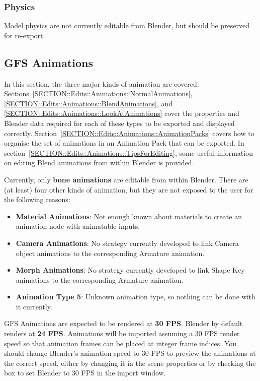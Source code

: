 \documentclass{article}
\begin{document}
\subsubsection{Physics}
Model physics are not currently editable from Blender, but should be preserved for re-export.

\clearpage
\subsection{GFS Animations}
In this section, the three major kinds of animation are covered. Sections~\ref{SECTION::Edits::Animations::NormalAnimations}, \ref{SECTION::Edits::Animations::BlendAnimations}, and \ref{SECTION::Edits::Animations::LookAtAnimations} cover the properties and Blender data required for each of these types to be exported and displayed correctly. Section~\ref{SECTION::Edits::Animations::AnimationPacks} covers how to organise the set of animations in an Animation Pack that can be exported. In section~\ref{SECTION::Edits::Animations::TipsForEditing}, some useful information on editing Blend animations from within Blender is provided.

Currently, only \textbf{bone animations} are editable from within Blender. There are (at least) four other kinds of animation, but they are not exposed to the user for the following reasons:
\begin{itemize}
\item \textbf{Material Animations}: Not enough known about materials to create an animation node with animatable inputs.
\item \textbf{Camera Animations}: No strategy currently developed to link Camera object animations to the corresponding Armature animation.
\item \textbf{Morph Animations}: No strategy currently developed to link Shape Key animations to the corresponding Armature animation.
\item \textbf{Animation Type 5}: Unknown animation type, so nothing can be done with it currently. 
\end{itemize}

GFS Animations are expected to be rendered at \textbf{30 FPS}. Blender by default renders at \textbf{24 FPS}. Animations will be imported assuming a 30 FPS render speed so that animation frames can be placed at integer frame indices. You should change Blender's animation speed to 30 FPS to preview the animations at the correct speed, either by changing it in the scene properties or by checking the box to set Blender to 30 FPS in the import window.
\end{document}
